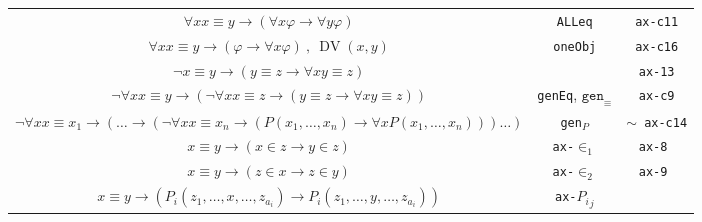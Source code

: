 \documentclass[11pt]{article}
\newcommand*{\comma}{\:,\:}
\renewcommand*{\phi}{\varphi}
\DeclareMathOperator{\DV}{DV}
\theoremstyle{plain}
\theoremstyle{definition}
\theoremstyle{remark}
\begin{document}
\begin{table}[!ht]
\begin{center}
\begin{tabular}{|c|c|c|}
$\forall x x \equiv y \to (\forall x \phi \to \forall y \phi)$ & \texttt{ALLeq} & \texttt{ax-c11}\\
$\forall x x \equiv y \to (\phi \to \forall x \phi) \comma \DV(x, y)$ & \texttt{oneObj} & \texttt{ax-c16}\\
\hline
$\neg x \equiv y \to (y \equiv z \to \forall x y \equiv z)$ & & \texttt{ax-13}\\
$\neg \forall x x \equiv y \to (\neg \forall x x \equiv z \to (y \equiv z \to \forall x y \equiv z))$ &
\texttt{genEq}, $\texttt{gen}_\equiv$ & \texttt{ax-c9}\\
\footnotesize{$\neg \forall x x \equiv x_1 \to ( \dots \to (\neg \forall x x \equiv x_n \to (P(x_1, \dots, x_n) \to \forall x P(x_1, \dots, x_n))) \dots)$}
& \texttt{gen$_P$} & $\sim$\texttt{ ax-c14}\phantom{$\sim$}\\
\hline
$x \equiv y \to (x \in z \to y \in z)$ & \texttt{ax-$\in_1$} & \texttt{ax-8 }\\
$x \equiv y \to (z \in x \to z \in y)$ & \texttt{ax-$\in_2$} & \texttt{ax-9 }\\
$x \equiv y \to (P_i(z_1, \ldots, x, \ldots, z_{a_i}) \to P_i(z_1, \ldots, y, \ldots, z_{a_i}))$ &
\texttt{ax-${P_i}_j$} &\\
\hline
\end{tabular}
\end{center}
\end{table}

\printbibliography
\end{document}
